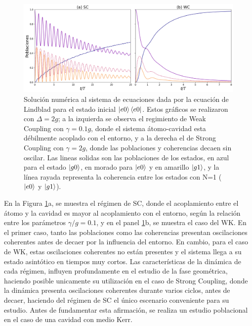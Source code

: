 \begin{figure}[H]
    \centering
    \includegraphics[width=\textwidth]{figuras/ch3/poblaciones sc vs wc.png}
    \caption{Solución numérica al sistema de ecuaciones dada por la ecuación de Lindblad para el estado inicial $\ket{e0}\bra{e0}$. Estos gráficos se realizaron con $\Delta=2g$; a la izquierda se observa el regimiento de Weak Coupling con $\gamma=0.1g$, donde el sistema átomo-cavidad esta débilmente acoplado con el entorno, y a la derecha el de Strong Coupling con $\gamma=2g$, donde las poblaciones y coherencias decaen sin oscilar. Las lineas solidas son las poblaciones de los estados, en azul para el estado $\ket{g0}$, en morado para $\ket{e0}$ y en amarillo $\ket{g1}$, y la línea rayada representa la coherencia entre los estados con N=1 ($\ket{e0}$ y $\ket{g1}$). }
    \label{fig3:poblaciones e0}
\end{figure}

En la Figura \ref{fig3:poblaciones e0}a, se muestra el régimen de SC, donde el acoplamiento entre el átomo y la cavidad es mayor al acoplamiento con el entorno, según la relación entre los parámetros $\gamma/g=0.1$, y en el panel \ref{fig3:poblaciones e0}b, se muestra el caso del WK. En el primer caso, tanto las poblaciones como las coherencias presentan oscilaciones coherentes antes de decaer por la influencia del entorno. En cambio, para el caso de WK, estas oscilaciones coherentes no están presentes y el sistema llega a su estado asintótico en tiempos muy cortos. Las características de la dinámica de cada régimen, influyen profundamente en el estudio de la fase geométrica, haciendo posible unicamente su utilización en el caso de Strong Coupling, donde la dinámica presenta oscilaciones coherentes durante varios ciclos, antes de decaer, haciendo del régimen de SC el único escenario conveniente para su estudio. Antes de fundamentar esta afirmación, se realiza un estudio poblacional en el caso de una cavidad con medio Kerr.

